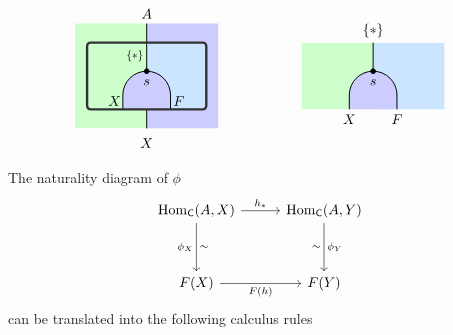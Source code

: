 \[\begin{tikzpicture}[x=0.6cm,y=0.6cm, baseline=(current bounding box.center), line width=0.7pt]
    \begin{scope}[shift={(0, -6.5)}, line width=0.7pt]
    \fill[fill=leftcolor] (-3,-0.4) rectangle (0,4); 
     \fill[fill=midcolor] (0, -0.4) rectangle (3,4); 
        \begin{scope} 
            \clip (-2.5,0.4) rectangle (2.5, 3.2);     
            \fill[fill=leftcolor] (-2.5,0) rectangle (0, 3.2);  
            \fill[fill=rightcolor] (0,0) rectangle (2.5, 3.2);  
            \draw[fill=midcolor, rounded corners=0.6cm] (-1, -2) rectangle (1, 2);
        \end{scope}
        \node[shift={(-0.35,0.35)}] at (-1, 0.4) {$X$};
        \node[shift={(0.35,0.35)}] at (1, 0.4) {$F$};
        \node[below=2pt] at (0, 2) {$s$};
        \draw[fill=black] (0, 2) circle (0.1);  
        \draw (0,4) -- (0,2);
        \draw (0, -0.4) -- (0,0.4);
        \node[below,shift={(-0.5,0.1)}] at (0, 3) {\scalebox{.8}{$\{*\}$}};
        \draw[line width=1.7pt, color=black!80, rounded corners=2.5pt] (-2.5, 0.4) rectangle (2.5, 3.2); %
        \node[above] at (0, 4){$A$};
        \node[below] at (0, -0.6){$X$};
    \end{scope}

    \begin{scope}[shift={(9.5, -6.5)}, line width=0.7pt]
        \begin{scope} 
            \clip (-3,0.4) rectangle (3,3.2);     
            \fill[fill=leftcolor] (-3,0) rectangle (0, 3.2);  
            \fill[fill=rightcolor] (0,0) rectangle (3, 3.2);  
            \draw[fill=midcolor, rounded corners=0.6cm] (-1, -2) rectangle (1, 2);
        \end{scope}
        \node[below] at (-1, 0.4) {$X$};
        \node[below] at (1, 0.4) {$F$};
        \node[below=2pt] at (0, 2) {$s$};
        \draw[fill=black] (0, 2) circle (0.1);  
        \draw (0,3.2) -- (0,2);
        \node[above] at (0, 3.2) {$\{*\}$};
    \end{scope}
    \end{tikzpicture}
\]

The naturality diagram of $\phi$ 
\[
    \begin{tikzcd}[ampersand replacement=\&, row sep = 3.5em]
        \mathrm{Hom}_{\mathsf{C}}(A,X) \arrow[d, "{\phi_X}"'{name=L, left}, "{\sim}"{name=R, right}]  \arrow[rr, "{h_*}"] \&[-20pt] \& {\mathrm{Hom}_{\mathsf{C}}(A,Y)} \arrow[d, "{\phi_Y}"'{name=L, right}, "{\sim}"{name=R, left}]\\
        {F(X)}\arrow[rr, "{F(h)}"'] \&  \& {F(Y)}  
    \end{tikzcd}
\]
can be translated into the following calculus rules

